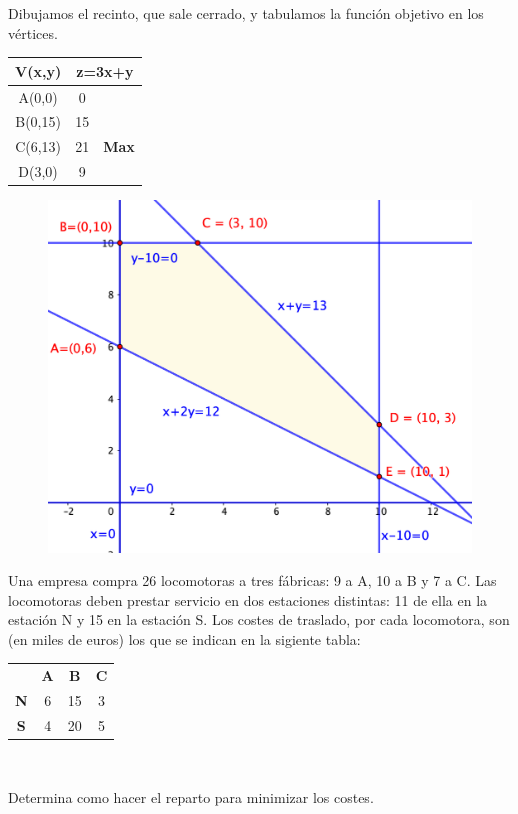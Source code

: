 \begin{multicols}{2}
Dibujamos el recinto, que sale cerrado,  y tabulamos la función objetivo en los vértices.

\begin{table}[H]
\centering
\begin{tabular}{c|cc}
\textbf{V(x,y)} & \multicolumn{2}{c}{\textbf{z=3x+y}} \\ \hline
A(0,0)          & 0           &                       \\
B(0,15)         & 15          & \textbf{}             \\
C(6,13)         & 21          & \textbf{Max}          \\
D(3,0)          & 9           &                      
\end{tabular}
\end{table}

\begin{figure}[H]
	\centering
	\includegraphics[width=.5\textwidth]{imagenes/img32.png}
\end{figure}
\end{multicols}


\vspace{10mm}
\begin{ejemplo}
\begin{ejer}
	Una empresa compra 26 locomotoras a tres fábricas: 9 a A, 10 a B y 7 a C. Las locomotoras deben prestar servicio en dos estaciones distintas: 11 de ella en la estación N y 15 en la estación S. Los costes de traslado, por cada locomotora, son (en miles de euros) los que se indican en la sigiente tabla:
\vspace{-5mm}%
\begin{multicols}{2}	
	\begin{table}[H]
	\centering
	\begin{tabular}{cc|c|c}
                                & \textbf{A} & \textbf{B} & \textbf{C}             \\ \cline{2-4} 
	\multicolumn{1}{c|}{\textbf{N}} & 6          & 15         & \multicolumn{1}{c|}{3} \\ \hline
	\multicolumn{1}{c|}{\textbf{S}} & 4          & 20         & \multicolumn{1}{c|}{5} \\ \cline{2-4} 
	\end{tabular}
	\end{table}
$\,$ 

Determina como hacer el reparto para minimizar los costes.
\end{multicols}
\end{ejer}	
\end{ejemplo}
\vspace{5mm}

